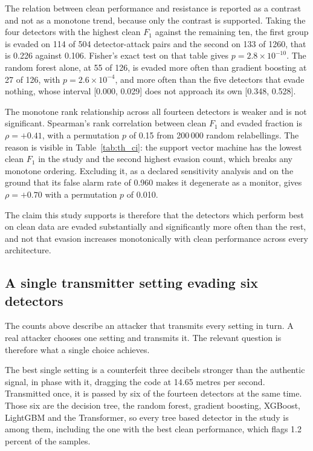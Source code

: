 \documentclass[pdflatex,sn-basic]{sn-jnl}
\theoremstyle{thmstyleone}
\theoremstyle{thmstyletwo}
\theoremstyle{thmstylethree}
\begin{document}
The relation between clean performance and resistance is reported as a contrast and not
as a monotone trend, because only the contrast is supported. Taking the four detectors with
the highest clean $F_1$ against the remaining ten, the first group is evaded on 114 of 504
detector-attack pairs and the second on 133 of 1260, that is 0.226 against 0.106. Fisher's
exact test on that table gives $p = 2.8 \times 10^{-10}$. The random forest alone, at 55 of
126, is evaded more often than gradient boosting at 27 of 126, with $p = 2.6 \times
10^{-4}$, and more often than the five detectors that evade nothing, whose interval
[0.000, 0.029] does not approach its own [0.348, 0.528].

The monotone rank relationship across all fourteen detectors is weaker and is not
significant. Spearman's rank correlation between clean $F_1$ and evaded fraction is
$\rho = +0.41$, with a permutation $p$ of 0.15 from 200\,000 random relabellings. The
reason is visible in Table~\ref{tab:th_ci}: the support vector machine has the lowest clean
$F_1$ in the study and the second highest evasion count, which breaks any monotone
ordering. Excluding it, as a declared sensitivity analysis and on the ground that its false
alarm rate of 0.960 makes it degenerate as a monitor, gives $\rho = +0.70$ with a
permutation $p$ of 0.010.

The claim this study supports is therefore that the detectors which perform best on clean
data are evaded substantially and significantly more often than the rest, and not that
evasion increases monotonically with clean performance across every architecture.

\subsection{A single transmitter setting evading six detectors}
\label{sec:res_single}

The counts above describe an attacker that transmits every setting in turn. A real
attacker chooses one setting and transmits it. The relevant question is therefore what a
single choice achieves.

The best single setting is a counterfeit three decibels stronger than the authentic
signal, in phase with it, dragging the code at 14.65 metres per second. Transmitted once,
it is passed by six of the fourteen detectors at the same time. Those six are the
decision tree, the random forest, gradient boosting, XGBoost, LightGBM and the
Transformer, so every tree based detector in the study is among them, including the one
with the best clean performance, which flags 1.2 percent of the samples.
\end{document}
